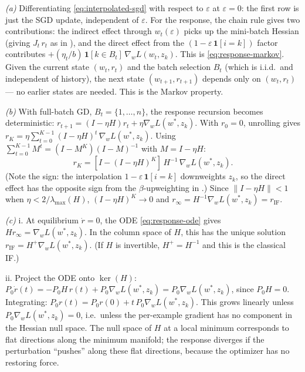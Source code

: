 \documentclass[11pt]{article}
\begin{document}
\begin{solution}[ex:unroll-to-if]

\textit{(a)} Differentiating \eqref{eq:interpolated-sgd} with respect to $\varepsilon$ at $\varepsilon = 0$: the first row is just the SGD update, independent of $\varepsilon$. For the response, the chain rule gives two contributions: the indirect effect through $w_t(\varepsilon)$ picks up the mini-batch Hessian (giving $J_t\,r_t$ as in ), and the direct effect from the $(1-\varepsilon\,\mathbf{1}[i=k])$ factor contributes $+(\eta_t/b)\,\mathbf{1}[k\in B_t]\,\nabla_w L(w_t,z_k)$. This is \eqref{eq:response-markov}. Given the current state $(w_t,r_t)$ and the batch selection $B_t$ (which is i.i.d.\ and independent of history), the next state $(w_{t+1},r_{t+1})$ depends only on $(w_t,r_t)$ --- no earlier states are needed. This is the Markov property.

\textit{(b)} With full-batch GD, $B_t = \{1,\dots,n\}$, the response recursion becomes deterministic: $r_{t+1} = (I-\eta H)r_t + \eta\nabla_w L(w^*,z_k)$. With $r_0 = 0$, unrolling gives $r_K = \eta\sum_{t=0}^{K-1}(I-\eta H)^t\,\nabla_w L(w^*,z_k)$. Using $\sum_{t=0}^{K-1}M^t = (I-M^K)(I-M)^{-1}$ with $M = I-\eta H$:
\[
  r_K = [I-(I-\eta H)^K]\,H^{-1}\,\nabla_w L(w^*,z_k).
\]
(Note the sign: the interpolation $1-\varepsilon\,\mathbf{1}[i=k]$ downweights $z_k$, so the direct effect has the opposite sign from the $\beta$-upweighting in .) Since $\|I-\eta H\| < 1$ when $\eta < 2/\lambda_{\max}(H)$, $(I-\eta H)^K \to 0$ and $r_\infty = H^{-1}\nabla_w L(w^*,z_k) = r_{\mathrm{IF}}$.

\textit{(c)} i. At equilibrium $\dot r = 0$, the ODE \eqref{eq:response-ode} gives $Hr_\infty = \nabla_w L(w^*,z_k)$. In the column space of $H$, this has the unique solution $r_{\mathrm{IF}} = H^+\nabla_w L(w^*,z_k)$. (If $H$ is invertible, $H^+ = H^{-1}$ and this is the classical IF.)

ii. Project the ODE onto $\ker(H)$: $P_0\dot{r}(t) = -P_0 H\,r(t) + P_0\nabla_w L(w^*,z_k) = P_0\nabla_w L(w^*,z_k)$, since $P_0 H = 0$. Integrating: $P_0 r(t) = P_0 r(0) + t\,P_0\nabla_w L(w^*,z_k)$. This grows linearly unless $P_0\nabla_w L(w^*,z_k) = 0$, i.e.\ unless the per-example gradient has no component in the Hessian null space. The null space of $H$ at a local minimum corresponds to flat directions along the minimum manifold; the response diverges if the perturbation ``pushes'' along these flat directions, because the optimizer has no restoring force.

\end{solution}
\end{document}
